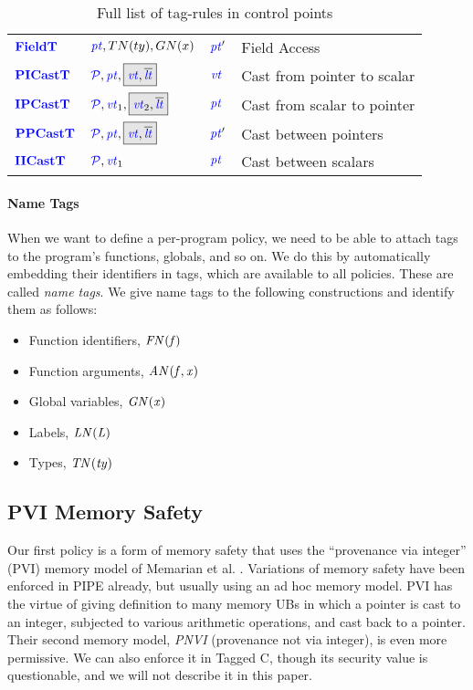 \documentclass{llncs}
\begin{document}
\begin{table}[t]
\begin{tabular}{|l|l|l|l|}
    \(\color{blue} \mathbf{FieldT}\)     & \(\mathit{\color{blue} pt}, TN(ty), GN(x)\)        & \(\mathit{\color{blue} pt}'\)     & Field Access \\
    \(\color{blue} \mathbf{PICastT}\)    & \(\picasttargs\)       & \(\mathit{\color{blue} vt}\)    & Cast from pointer to scalar \\
    \(\color{blue} \mathbf{IPCastT}\)    & \(\ipcasttargs\)       & \(\mathit{\color{blue} pt}\)    & Cast from scalar to pointer \\
    \(\color{blue} \mathbf{PPCastT}\)    & \(\ppcasttargs\)       & \(\mathit{\color{blue} pt}'\)    & Cast between pointers \\
    \(\color{blue} \mathbf{IICastT}\)    & \(\mathcal{\color{blue} P}, \mathit{\color{blue} vt}_1\)       & \(\mathit{\color{blue} pt}\)    & Cast between scalars \\
    \hline
  \end{tabular}

  \caption{Full list of tag-rules in control points}
  \label{fig:controlpoints}
\end{table}

\paragraph*{Name Tags}

When we want to define a per-program policy, we need to be able to attach tags to the program's
functions, globals, and so on. We do this by automatically embedding their identifiers in tags,
which are available to all policies. These are called {\em name tags}. We give name tags to the
following constructions and identify them as follows:
\begin{itemize}
\item Function identifiers, \(\mathit{FN(f)}\)
\item Function arguments, \(\mathit{AN(f,x)}\)
\item Global variables, \(\mathit{GN(x)}\)
\item Labels, \(\mathit{LN(L)}\)
\item Types, \(\mathit{TN(ty)}\)
\end{itemize}

\subsection{PVI Memory Safety}
\label{sec:PVI}

Our first policy is a form of memory safety that uses the ``provenance via integer'' (PVI) memory model
of Memarian et al. \cite{}. Variations of memory safety have been enforced in PIPE already, but usually using
an ad hoc memory model. PVI has the virtue of giving definition to many memory UBs in which a pointer is
cast to an integer, subjected to various arithmetic operations, and cast back to a pointer.
Their second memory model, {\it PNVI} (provenance not via integer), is even more permissive.
We can also enforce it in Tagged C, though its security value is questionable, and we will
not describe it in this paper.
\end{document}
